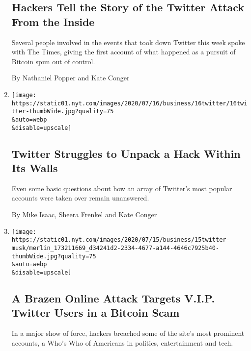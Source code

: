 \begin{enumerate}
  \hypertarget{hackers-tell-the-story-of-the-twitter-attack-from-the-inside}{%
  \subsection{Hackers Tell the Story of the Twitter Attack From the
  Inside}\label{hackers-tell-the-story-of-the-twitter-attack-from-the-inside}}

  Several people involved in the events that took down Twitter this week
  spoke with The Times, giving the first account of what happened as a
  pursuit of Bitcoin spun out of control.

  By Nathaniel Popper and Kate Conger
\item
  \href{/2020/07/16/technology/twitter-hack-investigation.html}{}

  \texttt{[image: https://static01.nyt.com/images/2020/07/16/business/16twitter/16twitter-thumbWide.jpg?quality=75\\\&auto=webp\\\&disable=upscale]}

  \hypertarget{twitter-struggles-to-unpack-a-hack-within-its-walls}{%
  \subsection{Twitter Struggles to Unpack a Hack Within Its
  Walls}\label{twitter-struggles-to-unpack-a-hack-within-its-walls}}

  Even some basic questions about how an array of Twitter's most popular
  accounts were taken over remain unanswered.

  By Mike Isaac, Sheera Frenkel and Kate Conger
\item
  \href{/2020/07/15/technology/twitter-hack-bill-gates-elon-musk.html}{}

  \texttt{[image: https://static01.nyt.com/images/2020/07/15/business/15twitter-musk/merlin\_173211669\_d34241d2-2334-4677-a144-4646c7925b40-thumbWide.jpg?quality=75\\\&auto=webp\\\&disable=upscale]}

  \hypertarget{a-brazen-online-attack-targets-vip-twitter-users-in-a-bitcoin-scam}{%
  \subsection{A Brazen Online Attack Targets V.I.P. Twitter Users in a
  Bitcoin
  Scam}\label{a-brazen-online-attack-targets-vip-twitter-users-in-a-bitcoin-scam}}

  In a major show of force, hackers breached some of the site's most
  prominent accounts, a Who's Who of Americans in politics,
  entertainment and tech.


\end{enumerate}
